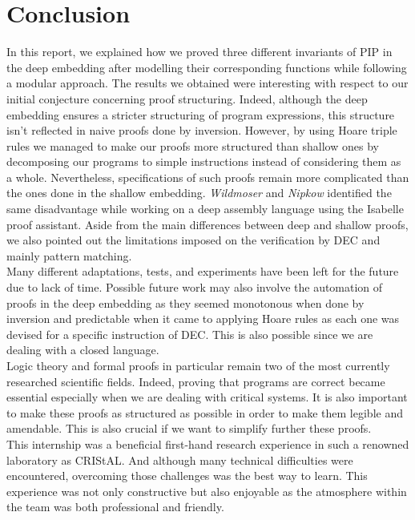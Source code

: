 \chapter{Conclusion}
In this report, we explained how we proved three different invariants of PIP in the deep embedding after modelling their corresponding functions while following a modular approach. The results we obtained were interesting with respect to our initial conjecture concerning proof structuring. Indeed, although the deep embedding ensures a stricter structuring of program expressions, this structure isn't reflected in naive proofs done by inversion. However, by using Hoare triple rules we managed to make our proofs more structured than shallow ones by decomposing our programs to simple instructions instead of considering them as a whole. Nevertheless, specifications of such proofs remain more complicated than the ones done in the shallow embedding. \textit{Wildmoser} and \textit{Nipkow} identified the same disadvantage while working on a deep assembly language using the Isabelle proof assistant\cite{Wildmoser}. Aside from the main differences between deep and shallow proofs, we also pointed out the limitations imposed on the verification by DEC and mainly pattern matching. \\

Many different adaptations, tests, and experiments have been left for the future due to lack of time. Possible future work may also involve the automation of proofs in the deep embedding as they seemed monotonous when done by inversion and predictable when it came to applying Hoare rules as each one was devised for a specific instruction of DEC. This is also possible since we are dealing with a closed language. \\

Logic theory and formal proofs in particular remain two of the most currently researched scientific fields. Indeed, proving that programs are correct became essential especially when we are dealing with critical systems. It is also important to make these proofs as structured as possible in order to make them legible and amendable. This is also crucial if we want to simplify further these proofs.  \\   

This internship was a beneficial first-hand research experience in such a renowned laboratory as CRIStAL. And although many technical difficulties were encountered, overcoming those challenges was the best way to learn. This experience was not only  constructive but also enjoyable as the atmosphere within the team was both professional and friendly. \\ 